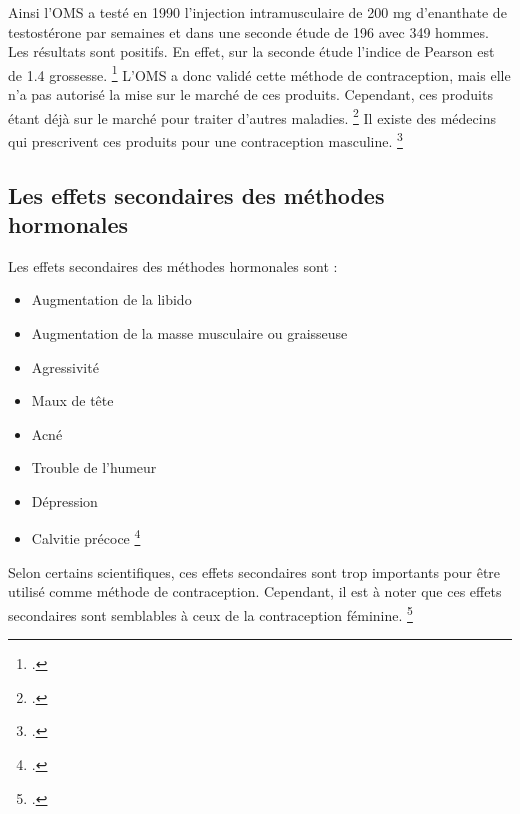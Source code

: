 \documentclass[12pt,a4paper]{report}
\begin{document}
Ainsi l'OMS a testé en 1990 l'injection intramusculaire de 200 mg d'enanthate de testostérone par semaines et dans une seconde étude de 196 avec 349 hommes. Les résultats sont positifs. En effet, sur la seconde étude l'indice de Pearson est de 1.4 grossesse. \footcite{guerinContraceptionMasculineHormonale1996}
L'OMS a donc validé cette méthode de contraception, mais elle n'a pas autorisé la mise sur le marché de ces produits. Cependant, ces produits étant déjà sur le marché pour traiter d'autres maladies. \footcite{anne-sophiedelcourHommeSousPilule} Il existe des médecins qui prescrivent ces produits pour une contraception masculine. \footcite{guillaumedaudinContraceptesEnqueteDernier2022}


\subsection{Les effets secondaires des méthodes hormonales}

Les effets secondaires des méthodes hormonales sont :
\begin{itemize}
    \item Augmentation de la libido
    \item Augmentation de la masse musculaire ou graisseuse
    \item Agressivité
    \item Maux de tête
    \item Acné
    \item Trouble de l'humeur
    \item Dépression
    \item Calvitie précoce \footcites{guillaumedaudinContraceptesEnqueteDernier2022}{anne-sophiedelcourHommeSousPilule}{ContraceptionHormonaleMasculine2016}
\end{itemize}

Selon certains scientifiques, ces effets secondaires sont trop importants pour être utilisé comme méthode de contraception. Cependant, il est à noter que ces effets secondaires sont semblables à ceux de la contraception féminine. \footcite{ContraceptionHormonaleMasculine2016}






\listoffigures
\end{document}
